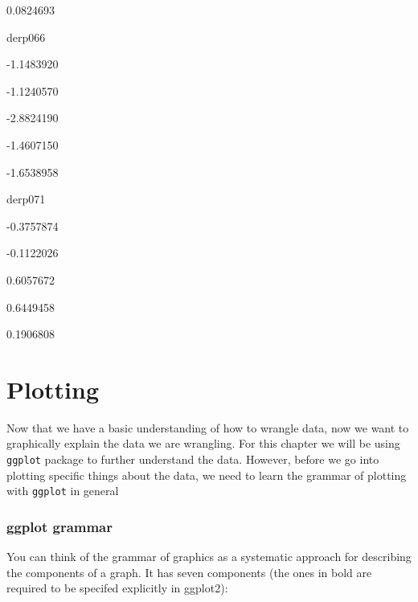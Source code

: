 \documentclass[]{book}
\begin{document}
0.0824693

derp066

-1.1483920

-1.1240570

-2.8824190

-1.4607150

-1.6538958

derp071

-0.3757874

-0.1122026

0.6057672

0.6449458

0.1906808

\chapter{Plotting}\label{plotting}

Now that we have a basic understanding of how to wrangle data, now we
want to graphically explain the data we are wrangling. For this chapter
we will be using \texttt{ggplot} package to further understand the data.
However, before we go into plotting specific things about the data, we
need to learn the grammar of plotting with \texttt{ggplot} in general

\subsection{ggplot grammar}\label{ggplot-grammar}

You can think of the grammar of graphics as a systematic approach for
describing the components of a graph. It has seven components (the ones
in bold are required to be specifed explicitly in ggplot2):
\end{document}
